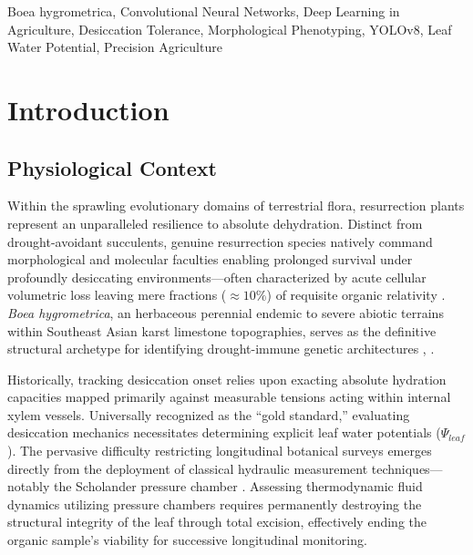 \documentclass[conference]{IEEEtran}
\begin{document}
\begin{IEEEkeywords}
Boea hygrometrica, Convolutional Neural Networks, Deep Learning in Agriculture, Desiccation Tolerance, Morphological Phenotyping, YOLOv8, Leaf Water Potential, Precision Agriculture
\end{IEEEkeywords}

\section{Introduction}
\subsection{Physiological Context}
Within the sprawling evolutionary domains of terrestrial flora, resurrection plants represent an unparalleled resilience to absolute dehydration. Distinct from drought-avoidant succulents, genuine resurrection species natively command morphological and molecular faculties enabling prolonged survival under profoundly desiccating environments—often characterized by acute cellular volumetric loss leaving mere fractions ($\approx 10\%$) of requisite organic relativity \cite{farrant}. \textit{Boea hygrometrica}, an herbaceous perennial endemic to severe abiotic terrains within Southeast Asian karst limestone topographies, serves as the definitive structural archetype for identifying drought-immune genetic architectures \cite{oliver}, \cite{wang}. 

Historically, tracking desiccation onset relies upon exacting absolute hydration capacities mapped primarily against measurable tensions acting within internal xylem vessels. Universally recognized as the ``gold standard,'' evaluating desiccation mechanics necessitates determining explicit leaf water potentials ($\Psi_{leaf}$). The pervasive difficulty restricting longitudinal botanical surveys emerges directly from the deployment of classical hydraulic measurement techniques—notably the Scholander pressure chamber \cite{jones}. Assessing thermodynamic fluid dynamics utilizing pressure chambers requires permanently destroying the structural integrity of the leaf through total excision, effectively ending the organic sample's viability for successive longitudinal monitoring.
\end{document}
